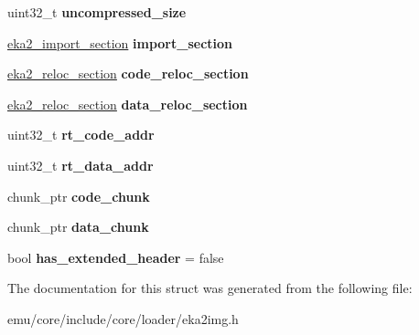 \begin{DoxyCompactItemize}
uint32\+\_\+t {\bfseries uncompressed\+\_\+size}
\item 
\mbox{\label{structeka2l1_1_1loader_1_1eka2img_a16e63f4b69c048f447a09a33033009aa}} 
\mbox{\hyperlink{structeka2l1_1_1loader_1_1eka2__import__section}{eka2\+\_\+import\+\_\+section}} {\bfseries import\+\_\+section}
\item 
\mbox{\label{structeka2l1_1_1loader_1_1eka2img_a2600d8dfa0968021ef7af5c10fa6b998}} 
\mbox{\hyperlink{structeka2l1_1_1loader_1_1eka2__reloc__section}{eka2\+\_\+reloc\+\_\+section}} {\bfseries code\+\_\+reloc\+\_\+section}
\item 
\mbox{\label{structeka2l1_1_1loader_1_1eka2img_ac3f9442c45afad3e3a6f0aea9a592f7f}} 
\mbox{\hyperlink{structeka2l1_1_1loader_1_1eka2__reloc__section}{eka2\+\_\+reloc\+\_\+section}} {\bfseries data\+\_\+reloc\+\_\+section}
\item 
\mbox{\label{structeka2l1_1_1loader_1_1eka2img_a4e8a72f4df18477a4bc17765dba5e211}} 
uint32\+\_\+t {\bfseries rt\+\_\+code\+\_\+addr}
\item 
\mbox{\label{structeka2l1_1_1loader_1_1eka2img_a0c18c50e2d47fb4851971cc5d5405115}} 
uint32\+\_\+t {\bfseries rt\+\_\+data\+\_\+addr}
\item 
\mbox{\label{structeka2l1_1_1loader_1_1eka2img_a3c1a5e2a595cdcc92ed50d864cda2c55}} 
chunk\+\_\+ptr {\bfseries code\+\_\+chunk}
\item 
\mbox{\label{structeka2l1_1_1loader_1_1eka2img_aa64b57c8f397e8d3d1e785922aee06d4}} 
chunk\+\_\+ptr {\bfseries data\+\_\+chunk}
\item 
\mbox{\label{structeka2l1_1_1loader_1_1eka2img_a2b30b303f1bab0d313da80efde6f5485}} 
bool {\bfseries has\+\_\+extended\+\_\+header} = false
\end{DoxyCompactItemize}


The documentation for this struct was generated from the following file\+:\begin{DoxyCompactItemize}
\item 
emu/core/include/core/loader/eka2img.\+h\end{DoxyCompactItemize}
